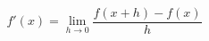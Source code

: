 \documentclass[12pt]{article}
\begin{document}
  
  
\[  
f'(x) = \lim\limits_{h \rightarrow 0} \frac{f(x+h) - f(x)}{h}  
\]  
  
\end{document}
